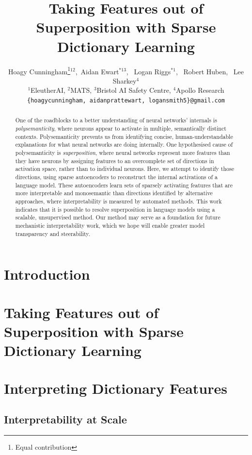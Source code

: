 \documentclass{article}
\title{Taking Features out of Superposition with Sparse Dictionary Learning}
\author{Hoagy Cunningham\thanks{Equal contribution}\hspace{4pt}$^{1 2}$,\  Aidan Ewart$^{* 1 3}$, \ Logan Riggs$^{* 1}$, \ Robert Huben, \ Lee Sharkey$^{4}$ \\
$^1$EleutherAI, $^2$MATS, $^3$Bristol AI Safety Centre, $^4$Apollo Research \\
\texttt{\{hoagycunningham, aidanprattewart, logansmith5\}@gmail.com}}
\begin{document}
\maketitle


\begin{abstract}
One of the roadblocks to a better understanding of neural networks' internals is \textit{polysemanticity}, where neurons appear to activate in multiple, semantically distinct contexts. Polysemanticity prevents us from identifying concise, human-understandable explanations for what neural networks are doing internally. One hypothesised cause of polysemanticity is \textit{superposition}, where neural networks represent more features than they have neurons by assigning features to an overcomplete set of directions in activation space, rather than to individual neurons. Here, we attempt to identify those directions, using sparse autoencoders to reconstruct the internal activations of a language model. These autoencoders learn sets of sparsely activating features that are more interpretable and monosemantic than directions identified by alternative approaches, where interpretability is measured by automated methods. This work indicates that it is possible to resolve superposition in language models using a scalable, unsupervised method. Our method may serve as a foundation for future mechanistic interpretability work, which we hope will enable greater model transparency and steerability.

\end{abstract}


\section{Introduction}


\section{Taking Features out of Superposition with Sparse Dictionary Learning}
\label{section:dictionary_learning}


\section{Interpreting Dictionary Features}
\label{section:autointerp}
\subsection{Interpretability at Scale}
\label{section:autointerp_background}

\end{document}
